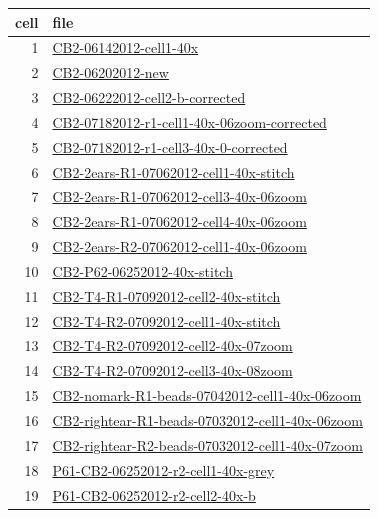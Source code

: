\documentclass{article}
\renewenvironment{table}[1][ht]{\comment}{\endcomment}
\begin{document}
\begin{table}[h!]
  \centering
  \begin{tabular}{rl}
    \toprule
    cell & file \\
    \midrule
    1& \url{CB2-06142012-cell1-40x}  \\
2& \url{CB2-06202012-new}  \\
3& \url{CB2-06222012-cell2-b-corrected}  \\
4& \url{CB2-07182012-r1-cell1-40x-06zoom-corrected}  \\
5& \url{CB2-07182012-r1-cell3-40x-0-corrected}  \\
6& \url{CB2-2ears-R1-07062012-cell1-40x-stitch}  \\
7& \url{CB2-2ears-R1-07062012-cell3-40x-06zoom}  \\
8& \url{CB2-2ears-R1-07062012-cell4-40x-06zoom}  \\
9& \url{CB2-2ears-R2-07062012-cell1-40x-06zoom}  \\
10& \url{CB2-P62-06252012-40x-stitch}  \\
11& \url{CB2-T4-R1-07092012-cell2-40x-stitch}  \\
12& \url{CB2-T4-R2-07092012-cell1-40x-stitch}  \\
13& \url{CB2-T4-R2-07092012-cell2-40x-07zoom}  \\
14& \url{CB2-T4-R2-07092012-cell3-40x-08zoom}  \\
15& \url{CB2-nomark-R1-beads-07042012-cell1-40x-06zoom}  \\
16& \url{CB2-rightear-R1-beads-07032012-cell1-40x-06zoom}  \\
17& \url{CB2-rightear-R2-beads-07032012-cell1-40x-07zoom}  \\
18& \url{P61-CB2-06252012-r2-cell1-40x-grey}  \\
19& \url{P61-CB2-06252012-r2-cell2-40x-b}  \\
\bottomrule
  \end{tabular}
  \caption{List of CB2 file names in data set. \label{CB2filenames}}
\end{table}

\clearpage
\end{document}

